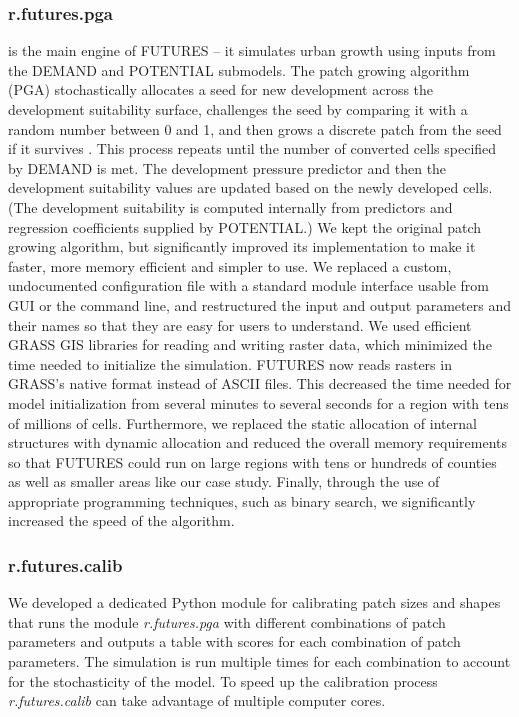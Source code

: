 \documentclass{isprs}
\begin{document}
\subsubsection{r.futures.pga}
is the main engine of FUTURES -- it simulates urban growth using inputs from the
DEMAND and POTENTIAL submodels.
The patch growing algorithm (PGA) stochastically allocates
a seed for new development across the development suitability surface,
challenges the seed by comparing it with a random number between 0 and 1, and
then grows a discrete patch from the seed if it survives \cite{Meentemeyer2012}. 
This process repeats
until the number of converted cells specified by DEMAND is met.
The development pressure predictor and then
the development suitability values are updated based on the newly developed cells.
(The development suitability is computed internally
from predictors and regression coefficients supplied by POTENTIAL.)
We kept the original patch growing algorithm,
but significantly improved its implementation to make it
faster, more memory efficient and simpler to use.
We replaced a custom, undocumented configuration file with a standard module interface
usable from GUI or the command line, and restructured the input and output
parameters and their names so that they are easy for users to understand. 
We used efficient GRASS GIS libraries for reading and writing raster data,
which minimized the time needed to initialize the simulation.
FUTURES now reads rasters in GRASS's native format
instead of ASCII files. 
This decreased the time needed for model initialization from several minutes to several seconds
for a region with tens of millions of cells.
Furthermore, we replaced the static allocation of internal structures with dynamic allocation
and reduced the overall memory requirements 
so that FUTURES could run on large regions with tens or hundreds of counties
as well as smaller areas like our case study.
Finally, through the use of appropriate programming techniques, such as binary search, we significantly increased the
speed of the algorithm.

\subsubsection{r.futures.calib}
We developed a dedicated Python module for calibrating patch sizes and shapes
that runs the module \emph{r.futures.pga}
with different combinations of patch parameters and outputs a table
with scores for each combination of patch parameters.
%
The simulation is run
multiple times for each combination 
to account for the stochasticity of the model.
To speed up the calibration process \emph{r.futures.calib} can take advantage of multiple
computer cores.
\end{document}

